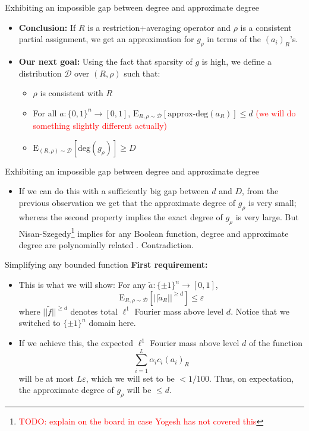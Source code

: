\begin{frame}{Exhibiting an impossible gap between degree and approximate degree}
	\begin{itemize}
		\item<1-> \textbf{Conclusion: }If $R$ is a restriction+averaging operator and $\rho$ is a consistent partial assignment, we get an approximation for $g_{\rho}$ in terms of the $(a_i)_R$'s.
		\item<2-> \textbf{Our next goal: }Using the fact that sparsity of $g$ is high, we define a distribution $\mathcal{D}$ over $(R,\rho)$ such that:
		\begin{itemize}
			\item $\rho$ is consistent with $R$
			\item For all $a: \{0,1\}^n \rightarrow [0,1]$, $\text{E}_{R, \rho \sim \mathcal{D}}[\text{approx-deg}(a_{R})] \leq d$ \textcolor{red}{(we will do something slightly different actually)}
			\item $\text{E}_{(R, \rho )\sim \mathcal{D}} [\text{deg}(g_{\rho})] \geq D$ 
		\end{itemize} 
	\end{itemize}
\end{frame}
\begin{frame}{Exhibiting an impossible gap between degree and approximate degree}
	\begin{itemize}		
		
		\item<1-> If we can do this with a sufficiently big gap between $d$ and $D$, from the previous observation we get that the approximate degree of $g_{\rho}$ is very small; whereas the second property implies the exact degree of $g_{\rho}$ is very large. But Nisan-Szegedy\footnote{\textcolor{red}{TODO: explain on the board in case Yogesh has not covered this}} implies for any Boolean function, degree and approximate degree are polynomially related . Contradiction.
		
		
	\end{itemize}	
	
\end{frame}



\begin{frame}{Simplifying any bounded function}
\textbf{First requirement: }
\begin{itemize}
\item<1-> This is what we will show: \newline
For any $\tilde{a}: \{ \pm 1\}^n \rightarrow [0,1]$, 
$$ \text{E}_{R, \rho \sim \mathcal{D}} [|| \tilde{a}_R ||^{\geq d}] \leq \varepsilon$$
where $||\tilde{f}||^{\geq d}$ denotes total $\ell^1$ Fourier mass above level $d$. \newline
Notice that we switched to $\{ \pm 1\}^n$ domain here.
\item<2-> If we achieve this, the expected $\ell^1$ Fourier mass above level $d$ of the function
$$ \displaystyle \sum_{i=1}^{L} \alpha_i c_i (a_i)_R$$ will be at most $L \varepsilon$, which we will set to be $<1/100$. Thus, on expectation, the approximate degree of $g_{\rho}$ will be $\leq d$.
\end{itemize}
\end{frame}

